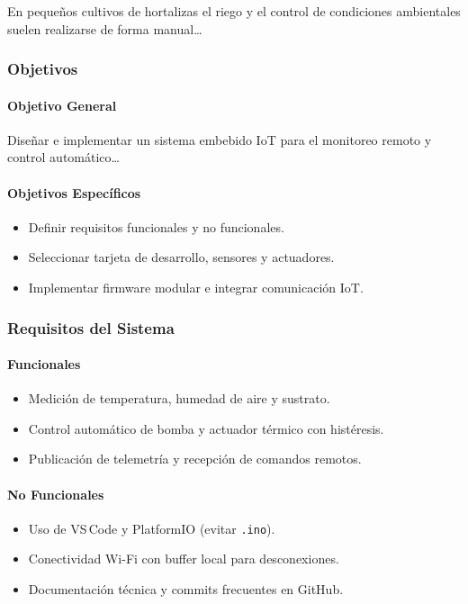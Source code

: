 \documentclass[conference]{IEEEtran}
\begin{document}
\noindent
En pequeños cultivos de hortalizas el riego y el control de
condiciones ambientales suelen realizarse de forma manual\ldots

\subsubsection{Objetivos}

\paragraph{Objetivo General}
Diseñar e implementar un sistema embebido IoT para el monitoreo
remoto y control automático\ldots

\paragraph{Objetivos Específicos}
\begin{itemize}
    \item Definir requisitos funcionales y no funcionales.
    \item Seleccionar tarjeta de desarrollo, sensores y actuadores.
    \item Implementar firmware modular e integrar comunicación IoT.
\end{itemize}

\subsubsection{Requisitos del Sistema}

\paragraph{Funcionales}
\begin{itemize}
    \item Medición de temperatura, humedad de aire y sustrato.
    \item Control automático de bomba y actuador térmico con histéresis.
    \item Publicación de telemetría y recepción de comandos remotos.
\end{itemize}

\paragraph{No Funcionales}
\begin{itemize}
    \item Uso de VS\,Code y PlatformIO (evitar \texttt{.ino}).
    \item Conectividad Wi-Fi con buffer local para desconexiones.
    \item Documentación técnica y commits frecuentes en GitHub.
\end{itemize}
\end{document}
